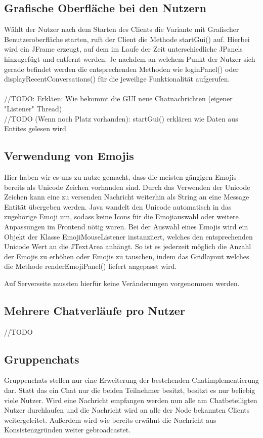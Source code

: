 
\author{Jan Grübener, Patrick Mischka}
\subsection{Grafische Oberfläche bei den Nutzern}
Wählt der Nutzer nach dem Starten des Clients die Variante mit Grafischer Benutzeroberfläche starten, ruft der Client die Methode startGui() auf. Hierbei wird ein JFrame erzeugt, auf dem im Laufe der Zeit unterschiedliche JPanels hinzugefügt und entfernt werden. Je nachdem an welchem Punkt der Nutzer sich gerade befindet werden die entsprechenden Methoden wie loginPanel() oder displayRecentConversations() für die jeweilige Funktionalität aufgerufen. \\ \\
//TODO: Erkläen: Wie bekommt die GUI neue Chatnachrichten (eigener "Listener" Thread) \\
//TODO (Wenn noch Platz vorhanden): startGui() erklären wie Daten aus Entites gelesen wird
\author{Jan Grübener, Patrick Mischka}
\subsection{Verwendung von Emojis}
Hier haben wir es uns zu nutze gemacht, dass die meisten gängigen Emojis bereits als Unicode Zeichen vorhanden sind. Durch das Verwenden der Unicode Zeichen kann eine zu versenden Nachricht weiterhin als String an eine Message Entität übergeben werden. Java wandelt den Unicode automatisch in das zugehörige Emoji um, sodass keine Icons für die Emojiauswahl oder weitere Anpassungen im Frontend nötig waren. Bei der Auswahl eines Emojis wird ein Objekt der Klasse EmojiMouseListener instanziiert, welches den entsprechenden Unicode Wert an die JTextArea anhängt. So ist es jederzeit möglich die Anzahl der Emojis zu erhöhen oder Emojis zu tauschen, indem das Gridlayout welches die Methode renderEmojiPanel() liefert angepasst wird.

Auf Serverseite mussten hierfür keine Veränderungen vorgenommen werden.

\author{Matthias Vonend, Troy Keßler}
\subsection{Mehrere Chatverläufe pro Nutzer}
//TODO

\author{Matthias Vonend, Aaron Schweig, Troy Keßler}
\subsection{Gruppenchats}
Gruppenchats stellen nur eine Erweiterung der bestehenden Chatimplementierung dar. Statt das ein Chat nur die beiden Teilnehmer besitzt, besitzt es nur beliebig viele Nutzer. Wird eine Nachricht empfangen werden nun alle am Chatbeteiligten Nutzer durchlaufen und die Nachricht wird an alle der Node bekannten Clients weitergeleitet. Außerdem wird wie bereits erwähnt die Nachricht aus Konsistenzgründen weiter gebroadcastet.

